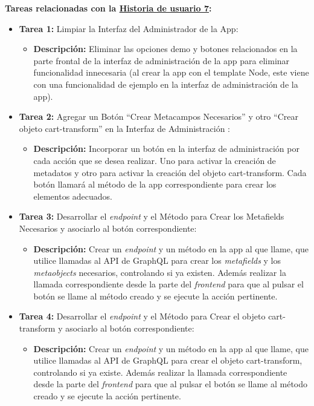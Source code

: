\documentclass[11pt]{article}
\begin{document}
\textbf{Tareas relacionadas con la \hyperref[sec:historia7]{Historia de usuario 7}:}
\begin{itemize}
    \item \textbf{Tarea 1:} Limpiar la Interfaz del Administrador de la App:
          \begin{itemize}[label=--]
              \item \textbf{Descripción:} Eliminar las opciones demo y botones relacionados en la parte frontal de la interfaz de administración de la app para eliminar funcionalidad innecesaria (al crear la app con el template Node, este viene con una funcionalidad de ejemplo en la interfaz de administración de la app).
          \end{itemize}
    \item \textbf{Tarea 2:} Agregar un Botón ``Crear Metacampos Necesarios'' y otro ``Crear objeto cart-transform'' en la Interfaz de Administración :
          \begin{itemize}[label=--]
              \item \textbf{Descripción:} Incorporar un botón en la interfaz de administración por cada acción que se desea realizar. Uno para activar la creación de metadatos y otro para activar la creación del objeto cart-transform. Cada botón llamará al método de la app correspondiente para crear los elementos adecuados.
          \end{itemize}
    \item \textbf{Tarea 3:} Desarrollar el \textit{endpoint} y el Método para Crear los Metafields Necesarios y asociarlo al botón correspondiente:
          \begin{itemize}[label=--]
              \item \textbf{Descripción:} Crear un \textit{endpoint} y un método en la app al que llame, que utilice llamadas al API de GraphQL para crear los \textit{metafields} y los \textit{metaobjects} necesarios, controlando si ya existen. Además realizar la llamada correspondiente desde la parte del \textit{frontend} para que al pulsar el botón se llame al método creado y se ejecute la acción pertinente.
          \end{itemize}
    \item \textbf{Tarea 4:} Desarrollar el \textit{endpoint} y el Método para Crear el objeto cart-transform y asociarlo al botón correspondiente:
          \begin{itemize}[label=--]
              \item \textbf{Descripción:} Crear un \textit{endpoint} y un método en la app al que llame, que utilice llamadas al API de GraphQL para crear el objeto cart-transform, controlando si ya existe. Además realizar la llamada correspondiente desde la parte del \textit{frontend} para que al pulsar el botón se llame al método creado y se ejecute la acción pertinente.

\end{itemize}
\end{itemize}
\end{document}
